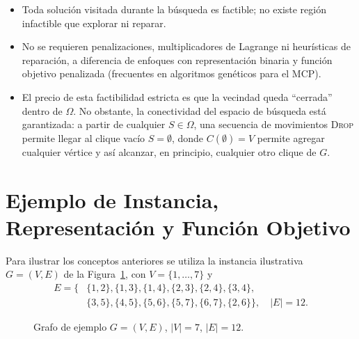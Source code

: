 \documentclass[letterpaper,12pt]{article}
\newcounter{ejemplo}
\begin{document}
\begin{itemize}
    \item Toda solución visitada durante la búsqueda es factible; no existe región infactible que explorar ni reparar.
    \item No se requieren penalizaciones, multiplicadores de Lagrange ni heurísticas de reparación, a diferencia de enfoques con representación binaria y función objetivo penalizada (frecuentes en algoritmos genéticos para el MCP).
    \item El precio de esta factibilidad estricta es que la vecindad queda ``cerrada'' dentro de $\Omega$. No obstante, la conectividad del espacio de búsqueda está garantizada: a partir de cualquier $S \in \Omega$, una secuencia de movimientos \textsc{Drop} permite llegar al clique vacío $S=\emptyset$, donde $C(\emptyset)=V$ permite agregar cualquier vértice y así alcanzar, en principio, cualquier otro clique de $G$.
\end{itemize}

\section{Ejemplo de Instancia, Representación y Función Objetivo}\label{sec:ejemplo}

Para ilustrar los conceptos anteriores se utiliza la instancia ilustrativa $G=(V,E)$ de la Figura~\ref{fig:ejemplo_grafo}, con $V=\{1,\dots,7\}$ y
\[
\begin{aligned}
E = \{&\{1,2\},\{1,3\},\{1,4\},\{2,3\},\{2,4\},\{3,4\},\\
      &\{3,5\},\{4,5\},\{5,6\},\{5,7\},\{6,7\},\{2,6\}\}, \quad |E|=12.
\end{aligned}
\]

\begin{figure}[H]
\centering
{}
\caption{Grafo de ejemplo $G=(V,E)$, $|V|=7$, $|E|=12$.}
\label{fig:ejemplo_grafo}
\end{figure}
\end{document}
